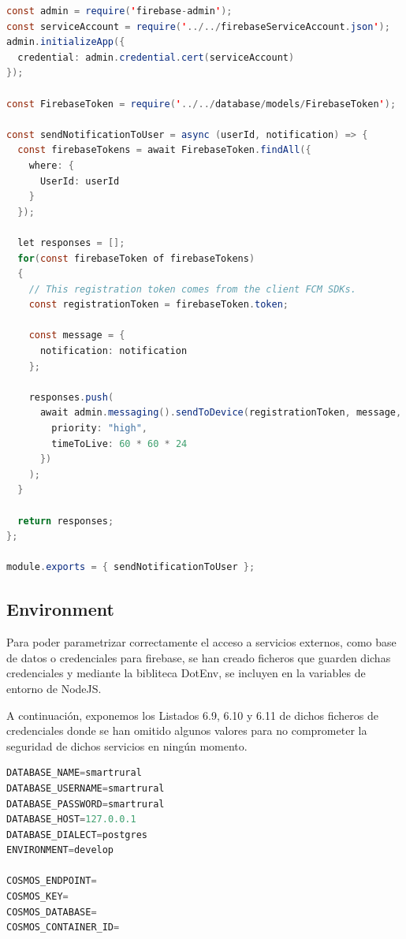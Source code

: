 \begin{lstlisting}[language=Java,caption={Enviar notificación a dispositivo},captionpos=b]
const admin = require('firebase-admin');
const serviceAccount = require('../../firebaseServiceAccount.json');
admin.initializeApp({
  credential: admin.credential.cert(serviceAccount)
});

const FirebaseToken = require('../../database/models/FirebaseToken');

const sendNotificationToUser = async (userId, notification) => {
  const firebaseTokens = await FirebaseToken.findAll({
    where: {
      UserId: userId
    }
  });

  let responses = [];
  for(const firebaseToken of firebaseTokens)
  {
    // This registration token comes from the client FCM SDKs.
    const registrationToken = firebaseToken.token;

    const message = {
      notification: notification
    };

    responses.push(
      await admin.messaging().sendToDevice(registrationToken, message, {
        priority: "high",
        timeToLive: 60 * 60 * 24
      })
    );
  }

  return responses;
};

module.exports = { sendNotificationToUser };
\end{lstlisting}

\subsection{Environment}
Para poder parametrizar correctamente el acceso a servicios externos, como base de datos o credenciales para firebase, se han creado ficheros que guarden dichas credenciales y mediante la bibliteca DotEnv, se incluyen en la variables de entorno de NodeJS.

A continuación, exponemos los Listados 6.9, 6.10 y 6.11 de dichos ficheros de credenciales donde se han omitido algunos valores para no comprometer la seguridad de dichos servicios en ningún momento.

\begin{lstlisting}[language=Java,caption={Fichero .env},captionpos=b]
DATABASE_NAME=smartrural
DATABASE_USERNAME=smartrural
DATABASE_PASSWORD=smartrural
DATABASE_HOST=127.0.0.1
DATABASE_DIALECT=postgres
ENVIRONMENT=develop

COSMOS_ENDPOINT=
COSMOS_KEY=
COSMOS_DATABASE=
COSMOS_CONTAINER_ID=
\end{lstlisting}

